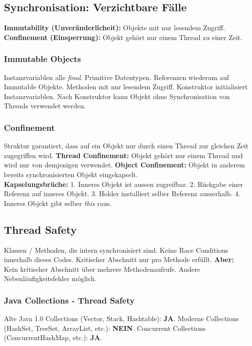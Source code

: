\subsection{Synchronisation: Verzichtbare Fälle}
\textbf{Immutability (Unveränderlicheit):} Objekte mit nur lesendem Zugriff.
\textbf{Confinement (Einsperrung):} Objekt gehört nur einem Thread zu einer Zeit.

\subsubsection{Immutable Objects}
Instanzvariablen alle \textit{final}. Primitive Datentypen. Referenzen wiederum auf Immutable Objekte.
Methoden mit nur lesendem Zugriff. Konstruktor initialisiert Instanzvariablen.
Nach Konstruktor kann Objekt ohne Synchronisation von Threads verwendet werden.

\subsubsection{Confinement}
Struktur garantiert, dass auf ein Objekt nur durch einen Thread zur gleichen Zeit zugegriffen wird.
\textbf{Thread Confinement:} Objekt gehört nur einem Thread und wird nur von demjenigen verwendet.
\textbf{Object Confinement:} Objekt in anderem bereits synchronisierten Objekt eingekapselt.\\ 
\textbf{Kapselungsbrüche:} 1. Inneres Objekt ist aussen zugreifbar. 2. Rückgabe einer Referenz auf inneres Objekt.
3. Holder installiert selber Referenz ausserhalb. 4. Inneres Objekt gibt selber \textit{this} raus.


\subsection{Thread Safety}
Klassen / Methoden, die intern synchronisiert sind. Keine Race Conditions innerhalb dieses Codes.
Kritischer Abschnitt nur pro Methode erfüllt.
\textbf{Aber:} Kein kritischer Abschnitt über mehrere Methodenaufrufe. 
Andere Nebenläufigkeitsfehler möglich.

\subsubsection{Java Collections - Thread Safety}
Alte Java 1.0 Collections (Vector, Stack, Hashtable): \textbf{JA}. 
Moderne Collections (HashSet, TreeSet, ArrayList, etc.): \textbf{NEIN}.
Concurrent Collections (ConcurrentHashMap, etc.): \textbf{JA}.

